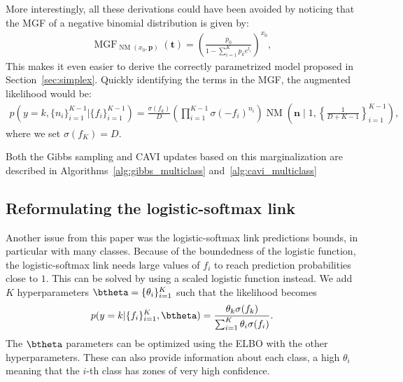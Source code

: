 More interestingly, all these derivations could have been avoided by noticing that the \ac{MGF} of a negative binomial distribution is given by:
\begin{align*}
    \operatorname{MGF}_{\operatorname{NM}(x_0,\boldsymbol{p})}(\boldsymbol{t}) = \left(\frac{p_0}{1-\sum_{i=1}^K p_k e^{t_i}}\right)^{x_0},
\end{align*}
This makes it even easier to derive the correctly parametrized model proposed in Section~\ref{sec:simplex}.
Quickly identifying the terms in the \ac{MGF}, the augmented likelihood would be:
\begin{align*}
    p\left(y=k,\{n_i\}_{i=1}^{K-1}|\{f_i\}_{i=1}^{K-1}\right) = \frac{\sigma(f_k)}{D}\left(\prod_{i=1}^{K-1}\sigma(-f_i)^{n_i}\right)\operatorname{NM}\left(\boldsymbol{n}\mid 1, \left\{\frac{1}{D+K-1}\right\}_{i=1}^{K-1}\right),
\end{align*}
where we set $\sigma(f_K) = D$.

Both the Gibbs sampling and \ac{CAVI} updates based on this marginalization are described in Algorithms~\ref{alg:gibbs_multiclass} and~\ref{alg:cavi_multiclass}

\subsection{Reformulating the logistic-softmax link}
\label{sec:scale_multiclass}
Another issue from this paper was the logistic-softmax link predictions bounds, in particular with many classes.
Because of the boundedness of the logistic function, the logistic-softmax link needs large values of $f_i$ to reach prediction probabilities close to $1$.
This can be solved by using a scaled logistic function instead.
We add $K$ hyperparameters $\btheta=\{\theta_{i}\}_{i=1}^K$ such that the likelihood becomes
\begin{align*}
    p(y=k|\{f_i\}_{i=1}^K,\btheta) = \frac{\theta_k \sigma(f_k)}{\sum_{i=1}^K \theta_i \sigma(f_i)}.
\end{align*}
The $\btheta$ parameters can be optimized using the \ac{ELBO} with the other hyperparameters.
These can also provide information about each class, a high $\theta_i$ meaning that the $i$-th class has zones of very high confidence.

